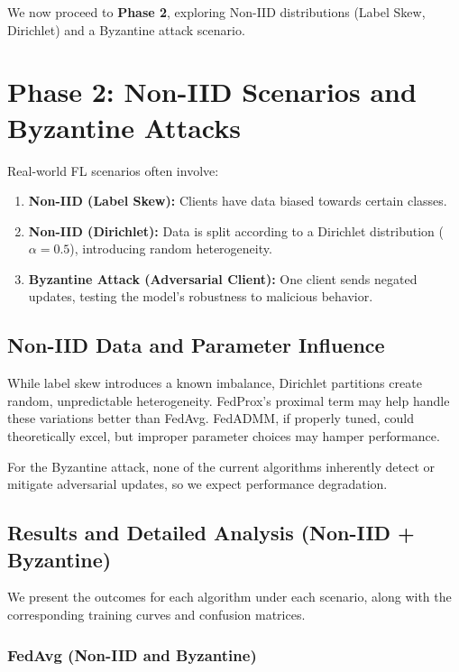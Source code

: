 \documentclass[12pt,a4paper]{report}
\begin{document}
\bigskip

We now proceed to \textbf{Phase 2}, exploring Non-IID distributions (Label Skew, Dirichlet) and a Byzantine attack scenario.

\newpage

\chapter{Phase 2: Non-IID Scenarios and Byzantine Attacks}

Real-world FL scenarios often involve:
\begin{enumerate}
	\item \textbf{Non-IID (Label Skew):} Clients have data biased towards certain classes.
	\item \textbf{Non-IID (Dirichlet):} Data is split according to a Dirichlet distribution ($\alpha=0.5$), introducing random heterogeneity.
	\item \textbf{Byzantine Attack (Adversarial Client):} One client sends negated updates, testing the model’s robustness to malicious behavior.
\end{enumerate}

\section{Non-IID Data and Parameter Influence}

While label skew introduces a known imbalance, Dirichlet partitions create random, unpredictable heterogeneity. FedProx’s proximal term may help handle these variations better than FedAvg. FedADMM, if properly tuned, could theoretically excel, but improper parameter choices may hamper performance.

For the Byzantine attack, none of the current algorithms inherently detect or mitigate adversarial updates, so we expect performance degradation.

\section{Results and Detailed Analysis (Non-IID + Byzantine)}

We present the outcomes for each algorithm under each scenario, along with the corresponding training curves and confusion matrices.

\subsection{FedAvg (Non-IID and Byzantine)}
\end{document}
